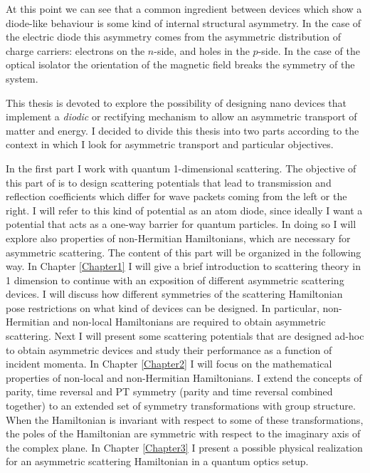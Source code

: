 At this point we can see that a common ingredient between devices which show a diode-like behaviour is some kind of internal structural asymmetry. In the case of the electric diode this asymmetry comes from the asymmetric distribution of charge carriers: electrons on the $n$-side, and holes in the $p$-side. In the case of the optical isolator the orientation of the magnetic field breaks the symmetry of the system.

This thesis is devoted to explore the possibility of designing nano devices that implement a \textit{diodic} or rectifying mechanism to allow an asymmetric transport of matter and energy. I decided to divide this thesis into two parts according to the context in which I look for asymmetric transport and particular objectives.

In the first part I work with quantum 1-dimensional scattering. The objective of this part of is to design scattering potentials that lead to transmission and reflection coefficients which differ for wave packets coming from the left or the right. I will refer to this kind of potential as an atom diode, since ideally I want a potential that acts as a one-way barrier for quantum particles. In doing so I will explore also properties of non-Hermitian Hamiltonians, which are necessary for asymmetric scattering. The content of this part will be organized in the following way. In Chapter \ref{Chapter1} I will give a brief introduction to scattering theory in 1 dimension to continue with an exposition of different asymmetric scattering devices. I will discuss how different symmetries of the scattering Hamiltonian pose restrictions on what kind of devices can be designed. In particular, non-Hermitian and non-local Hamiltonians are required to obtain asymmetric scattering. Next I will present some scattering potentials that are designed ad-hoc to obtain asymmetric devices and study their performance as a function of incident momenta. In Chapter \ref{Chapter2} I will focus on the mathematical properties of non-local and non-Hermitian Hamiltonians. I extend the concepts of parity, time reversal and PT symmetry (parity and time reversal combined together) to an extended set of symmetry transformations with group structure. When the Hamiltonian is invariant with respect to some of these transformations, the poles of the Hamiltonian are symmetric with respect to the imaginary axis of the complex plane. In Chapter \ref{Chapter3} I present a possible physical realization for an asymmetric scattering Hamiltonian in a quantum optics setup.

